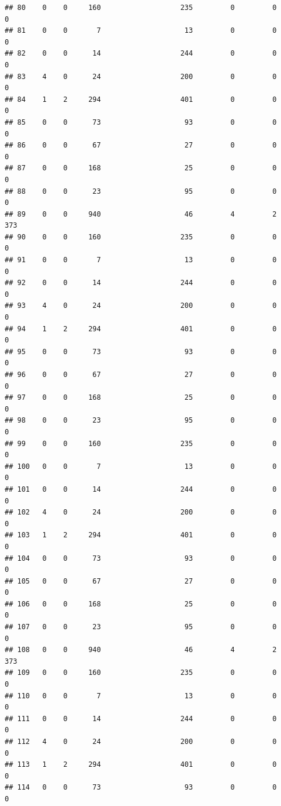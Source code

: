 \documentclass[
]{article}
\begin{document}
\begin{verbatim}
## 80    0    0     160                   235         0         0        0
## 81    0    0       7                    13         0         0        0
## 82    0    0      14                   244         0         0        0
## 83    4    0      24                   200         0         0        0
## 84    1    2     294                   401         0         0        0
## 85    0    0      73                    93         0         0        0
## 86    0    0      67                    27         0         0        0
## 87    0    0     168                    25         0         0        0
## 88    0    0      23                    95         0         0        0
## 89    0    0     940                    46         4         2      373
## 90    0    0     160                   235         0         0        0
## 91    0    0       7                    13         0         0        0
## 92    0    0      14                   244         0         0        0
## 93    4    0      24                   200         0         0        0
## 94    1    2     294                   401         0         0        0
## 95    0    0      73                    93         0         0        0
## 96    0    0      67                    27         0         0        0
## 97    0    0     168                    25         0         0        0
## 98    0    0      23                    95         0         0        0
## 99    0    0     160                   235         0         0        0
## 100   0    0       7                    13         0         0        0
## 101   0    0      14                   244         0         0        0
## 102   4    0      24                   200         0         0        0
## 103   1    2     294                   401         0         0        0
## 104   0    0      73                    93         0         0        0
## 105   0    0      67                    27         0         0        0
## 106   0    0     168                    25         0         0        0
## 107   0    0      23                    95         0         0        0
## 108   0    0     940                    46         4         2      373
## 109   0    0     160                   235         0         0        0
## 110   0    0       7                    13         0         0        0
## 111   0    0      14                   244         0         0        0
## 112   4    0      24                   200         0         0        0
## 113   1    2     294                   401         0         0        0
## 114   0    0      73                    93         0         0        0

\end{verbatim}
\end{document}
